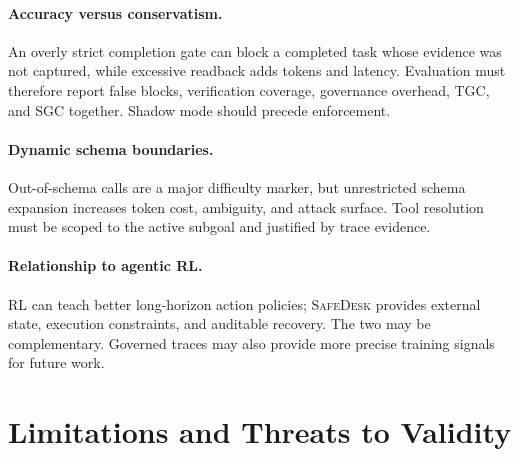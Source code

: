 \documentclass[10pt]{article}
\newcommand{\safedesk}{\textsc{SafeDesk}}
\begin{document}
\paragraph{Accuracy versus conservatism.}
An overly strict completion gate can block a completed task whose evidence was not
captured, while excessive readback adds tokens and latency. Evaluation must
therefore report false blocks, verification coverage, governance overhead, TGC,
and SGC together. Shadow mode should precede enforcement.

\paragraph{Dynamic schema boundaries.}
Out-of-schema calls are a major difficulty marker, but unrestricted schema
expansion increases token cost, ambiguity, and attack surface. Tool resolution
must be scoped to the active subgoal and justified by trace evidence.

\paragraph{Relationship to agentic RL.}
RL can teach better long-horizon action policies; \safedesk{} provides external
state, execution constraints, and auditable recovery. The two may be
complementary. Governed traces may also provide more precise training signals for
future work.

\section{Limitations and Threats to Validity}
\end{document}
